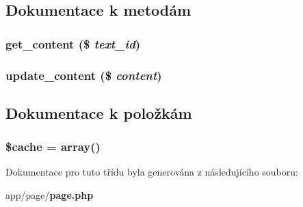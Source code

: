 \subsection{Dokumentace k metodám}
\subsubsection[{get\_\-content}]{\setlength{\rightskip}{0pt plus 5cm}get\_\-content (\$ {\em text\_\-id})}\label{da/d19/classpage__model_ab25fd475e50fd179b8bec3e9b6e0848d}
\subsubsection[{update\_\-content}]{\setlength{\rightskip}{0pt plus 5cm}update\_\-content (\$ {\em content})}\label{da/d19/classpage__model_a419240148f1dbcff164083fdb83b496a}


\subsection{Dokumentace k položkám}
\subsubsection[{\$cache}]{\setlength{\rightskip}{0pt plus 5cm}\$cache = array()\hspace{0.3cm}{\ttfamily  [private]}}\label{da/d19/classpage__model_ac2dc76d756ec398393d4b1d23659276c}


Dokumentace pro tuto třídu byla generována z následujícího souboru:\begin{DoxyCompactItemize}
\item 
app/page/{\bf page.php}\end{DoxyCompactItemize}

